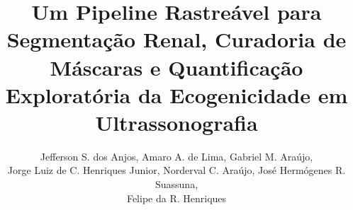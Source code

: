 \documentclass[12pt]{article}
\title{Um Pipeline Rastreável para Segmentação Renal, Curadoria de Máscaras e Quantificação Exploratória da Ecogenicidade em Ultrassonografia}
\author{Jefferson S. dos Anjos\inst{1}, Amaro A. de Lima\inst{1}, Gabriel M. Araújo\inst{1},\\
Jorge Luiz de C. Henriques Junior\inst{2}, Norderval C. Araújo\inst{2}, José Hermógenes R. Suassuna\inst{2},\\
Felipe da R. Henriques\inst{1}}
\newif\ifversaoqualificacao
\begin{document}
\ifversaoqualificacao
  \pagestyle{empty}
  

  \thispagestyle{empty}
  {\centering\bfseries\large RESUMO\par}
  \vspace{0.9cm}
  \begin{spacing}{1.0}
    \noindent\textoresumo\par
    \medskip
    \noindent\textbf{Palavras-chave:} ultrassonografia renal; segmentação semântica;
    destilação de conhecimento; curadoria humana; ecogenicidade.
  \end{spacing}
  \clearpage

  \thispagestyle{empty}
  {\centering\bfseries\large ABSTRACT\par}
  \vspace{0.9cm}
  \begin{spacing}{1.0}
    \noindent\textoabstract\par
    \medskip
    \noindent\textbf{Keywords:} renal ultrasound; semantic segmentation;
    knowledge distillation; human-in-the-loop; echogenicity.
  \end{spacing}
  \clearpage
\else
  \maketitle
  \begin{abstract}
    \textoabstract
  \end{abstract}
  \begin{resumo}
    \textoresumo
  \end{resumo}
\fi

\ifversaoqualificacao
  \clearpage
  \begingroup
    \setlength{\parskip}{0pt}
    \listoffigures
  \endgroup
  \clearpage
  \begingroup
    \setlength{\parskip}{0pt}
    \listoftables
  \endgroup
  \clearpage
\end{document}
